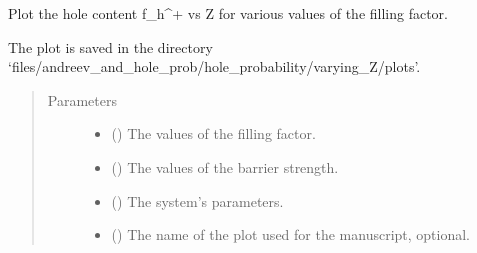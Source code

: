 \documentclass[letterpaper,10pt,english]{sphinxmanual}
\begin{document}
\begin{fulllineitems}
\label{\detokenize{modules:modules.utils.plot_fh_p_vs_Z_various_fillings}}
\pysigstartsignatures
{}
\pysigstopsignatures
\sphinxAtStartPar
Plot the hole content f\_h\textasciicircum{}+ vs Z for various values of the filling factor.

\sphinxAtStartPar
The plot is saved in the directory ‘files/andreev\_and\_hole\_prob/hole\_probability/varying\_Z/plots’.
\begin{quote}\begin{description}
\item[{Parameters}] \leavevmode\begin{itemize}
\item {} 
\sphinxAtStartPar
{} () \textendash{} The values of the filling factor.

\item {} 
\sphinxAtStartPar
{} () \textendash{} The values of the barrier strength.

\item {} 
\sphinxAtStartPar
{} () \textendash{} The system’s parameters.

\item {} 
\sphinxAtStartPar
{} () \textendash{} The name of the plot used for the manuscript, optional.

\end{itemize}

\end{description}\end{quote}

\end{fulllineitems}

\end{document}
